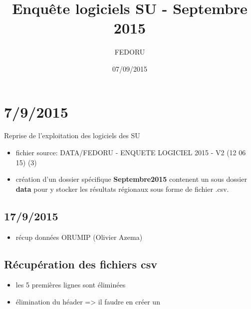 \documentclass[]{article}
\title{Enquête logiciels SU - Septembre 2015}
\author{FEDORU}
\date{07/09/2015}
\providecommand{\tightlist}{%
  \setlength{\itemsep}{0pt}\setlength{\parskip}{0pt}}
\begin{document}
\maketitle

{
\hypersetup{linkcolor=black}
\setcounter{tocdepth}{2}
\tableofcontents
}
\section{7/9/2015}\label{section}

Reprise de l'exploitation des logiciels des SU

\begin{itemize}
\tightlist
\item
  fichier source: DATA/FEDORU - ENQUETE LOGICIEL 2015 - V2 (12 06 15)
  (3)
\item
  création d'un dossier spécifique \textbf{Septembre2015} contenent un
  sous dossier \textbf{data} pour y stocker les résultats régionaux sous
  forme de fichier .csv.
\end{itemize}

\subsection{17/9/2015}\label{section-1}

\begin{itemize}
\tightlist
\item
  récup données ORUMIP (Olivier Azema)
\end{itemize}

\subsection{Récupération des fichiers
csv}\label{recuperation-des-fichiers-csv}

\begin{itemize}
\tightlist
\item
  les 5 premières lignes sont éliminées
\item
  élimination du héader =\textgreater{} il faudre en créer un
\end{itemize}
\end{document}
